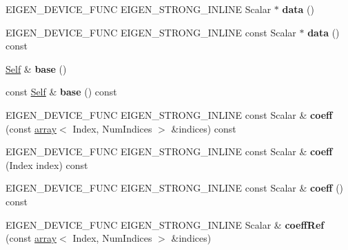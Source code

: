 \begin{DoxyCompactItemize}
E\+I\+G\+E\+N\+\_\+\+D\+E\+V\+I\+C\+E\+\_\+\+F\+U\+NC E\+I\+G\+E\+N\+\_\+\+S\+T\+R\+O\+N\+G\+\_\+\+I\+N\+L\+I\+NE Scalar $\ast$ {\bfseries data} ()
\item 
\mbox{\label{class_eigen_1_1_tensor_fixed_size_ae0368ca41415f66f57fead86ea49d332}} 
E\+I\+G\+E\+N\+\_\+\+D\+E\+V\+I\+C\+E\+\_\+\+F\+U\+NC E\+I\+G\+E\+N\+\_\+\+S\+T\+R\+O\+N\+G\+\_\+\+I\+N\+L\+I\+NE const Scalar $\ast$ {\bfseries data} () const
\item 
\mbox{\label{class_eigen_1_1_tensor_fixed_size_a5be0375818cc7dfe18237ac24515cf4a}} 
\hyperlink{class_eigen_1_1_tensor_fixed_size}{Self} \& {\bfseries base} ()
\item 
\mbox{\label{class_eigen_1_1_tensor_fixed_size_a23c06e6c763faa169dd257a3a6a4328e}} 
const \hyperlink{class_eigen_1_1_tensor_fixed_size}{Self} \& {\bfseries base} () const
\item 
\mbox{\label{class_eigen_1_1_tensor_fixed_size_aebf8e4efbc8adcd152aa2e45050f5742}} 
E\+I\+G\+E\+N\+\_\+\+D\+E\+V\+I\+C\+E\+\_\+\+F\+U\+NC E\+I\+G\+E\+N\+\_\+\+S\+T\+R\+O\+N\+G\+\_\+\+I\+N\+L\+I\+NE const Scalar \& {\bfseries coeff} (const \hyperlink{class_eigen_1_1array}{array}$<$ Index, Num\+Indices $>$ \&indices) const
\item 
\mbox{\label{class_eigen_1_1_tensor_fixed_size_ae29800f72960268b61181ac802ff293a}} 
E\+I\+G\+E\+N\+\_\+\+D\+E\+V\+I\+C\+E\+\_\+\+F\+U\+NC E\+I\+G\+E\+N\+\_\+\+S\+T\+R\+O\+N\+G\+\_\+\+I\+N\+L\+I\+NE const Scalar \& {\bfseries coeff} (Index index) const
\item 
\mbox{\label{class_eigen_1_1_tensor_fixed_size_a0422691e7495467f239e55fefe0f66dd}} 
E\+I\+G\+E\+N\+\_\+\+D\+E\+V\+I\+C\+E\+\_\+\+F\+U\+NC E\+I\+G\+E\+N\+\_\+\+S\+T\+R\+O\+N\+G\+\_\+\+I\+N\+L\+I\+NE const Scalar \& {\bfseries coeff} () const
\item 
\mbox{\label{class_eigen_1_1_tensor_fixed_size_a8659b7903814031122c82690cc7c010b}} 
E\+I\+G\+E\+N\+\_\+\+D\+E\+V\+I\+C\+E\+\_\+\+F\+U\+NC E\+I\+G\+E\+N\+\_\+\+S\+T\+R\+O\+N\+G\+\_\+\+I\+N\+L\+I\+NE Scalar \& {\bfseries coeff\+Ref} (const \hyperlink{class_eigen_1_1array}{array}$<$ Index, Num\+Indices $>$ \&indices)

\end{DoxyCompactItemize}
